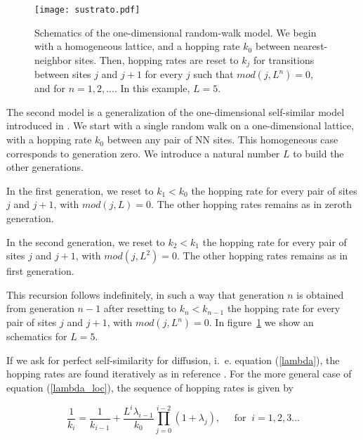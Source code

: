 \documentclass[12pt]{iopart}
\begin{document}
\begin{figure}[!ht]
	\begin{center}
	 \texttt{[image: sustrato.pdf]}	  
 \end{center}
	\caption{Schematics of the one-dimensional random-walk model. 
    We begin with a homogeneous lattice, and a hopping rate $k_0$ between 
    nearest-neighbor sites. Then, hopping rates are reset to $k_j$ for 
    transitions between sites $j$ and $j+1$ for every $j$ such that
    $mod(j,L^n)=0$,  and for $n=1,2,...$. In this example, $L=5$.
	}
    \label{sustrato_1D}
\end{figure}


The second model is a generalization of the one-dimensional self-similar 
model introduced in \cite{Padilla2009}. We start with a single random walk
on a one-dimensional lattice, with a hopping rate $k_0$ between any pair of
NN sites. This homogeneous case corresponds to generation 
zero. We introduce a natural number $L$ to build the other
generations. 

In the first generation, we reset to $k_1<k_0$ the hopping rate 
 for every pair of sites $j$ and $j+1$, with 
 $mod(j,L)=0$. The other hopping rates
 remains as in zeroth generation. 

 In the second generation, we reset to $k_2<k_1$ the hopping rate 
 for every pair of sites $j$ and $j+1$, with 
 $mod(j,L^2)=0$. The other hopping rates
 remains as in first generation. 

This recursion follows indefinitely, in such a way that generation
$n$ is obtained from generation $n-1$ after resetting to $k_n<k_{n-1}$
the hopping rate 
 for every pair of sites $j$ and $j+1$, with 
 $mod(j,L^n)=0$. In figure~\ref{sustrato_1D} we show an schematics for $L=5$.

If we ask for perfect self-similarity for diffusion, i.~e. equation
(\ref{lambda}), the hopping rates are found iteratively as in reference 
\cite{Padilla2009}. For the more general case of equation (\ref{lambda_loc}),
the sequence of hopping rates is given by

\begin{equation}
  \frac{1}{k_{i}}=\frac{1}{k_{i-1}}+\frac{L^i\lambda_{i-1}}{k_0}
  \prod_{j=0}^{i-2}(1+\lambda_j),\;\;\;\;\;\mbox{for}\;\; i=1,2,3...
  \label{k_i}
\end{equation}
\end{document}
